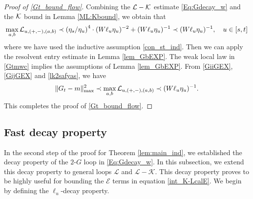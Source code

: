 \documentclass[10pt,reqno]{article}
\theoremstyle{plain} %
\theoremstyle{remark}
\numberwithin{equation}{section}
\begin{document}
 

\noindent 
\begin{proof}[Proof of \eqref{Gt_bound_flow}] Combining  the $\cal L-\cal K$ estimate  \eqref{Eq:Gdecay_w} and the $\cal K$ bound in Lemma \ref{ML:Kbound}, we obtain that
\begin{equation}
\label{lk2safyas}
 \max_{a, b}{\cal L }_{u, (+,-), (a,b)}\prec \left(\eta_s/\eta_u\right)^4\cdot (W\ell_u\eta_u)^{-2}+(W\ell_u\eta_u)^{-1}\prec (W\ell_u\eta_u)^{-1}  ,\quad u\in [s,t]    
\end{equation}
where we have used the inductive assumption  \eqref{con_st_ind}. 
Then we can apply  the resolvent entry estimate in Lemma \ref{lem_GbEXP}.  The weak local law in \eqref{Gtmwc} implies the assumptions of  Lemma \ref{lem_GbEXP}. From \eqref{GiiGEX}, \eqref{GijGEX} and  \eqref{lk2safyas}, we have 
$$
\|G_t-m\|^2_{\max}\prec  \max_{a, b}{\cal L }_{u, (+,-), (a,b)}\prec (W\ell_u\eta_u)^{-1} .
$$
This completes the proof of \eqref{Gt_bound_flow}.   
\end{proof}

  
\subsection{Fast decay property}
In the second step of the proof for Theorem \ref{lem:main_ind}, we established the decay property of the $2\text{-}G$ loop in \eqref{Eq:Gdecay_w}. In this subsection, we extend this decay property to general loops $\mathcal{L}$ and $\mathcal{L} - \mathcal{K}$. This decay property proves to be highly useful for bounding the $\mathcal{E}$ terms in equation \eqref{int_K-LcalE}. We begin by defining the $\ell_u$-decay property.
\end{document}
